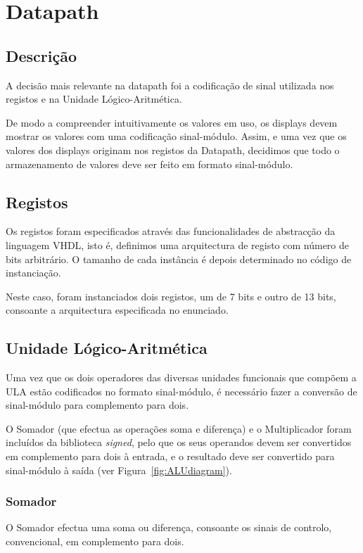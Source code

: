 \documentclass[a4paper]{article}
\begin{document}
\section{Datapath}
\subsection{Descrição}
A decisão mais relevante na datapath foi a codificação de sinal utilizada nos registos e na Unidade Lógico-Aritmética.

De modo a compreender intuitivamente os valores em uso, os displays devem mostrar os valores com uma codificação sinal-módulo. Assim, e uma vez que os valores dos displays originam nos registos da Datapath, decidimos que todo o armazenamento de valores deve ser feito em formato sinal-módulo.


\subsection{Registos}
Os registos foram especificados através das funcionalidades de abstracção da linguagem VHDL, isto é, definimos uma arquitectura de registo com número de bits arbitrário. O tamanho de cada instância é depois determinado no código de instanciação.

Neste caso, foram instanciados dois registos, um de 7 bits e outro de 13 bits, consoante a arquitectura especificada no enunciado.


\subsection{Unidade Lógico-Aritmética}
Uma vez que os dois operadores das diversas unidades funcionais que compõem a ULA estão codificados no formato sinal-módulo, é necessário fazer a conversão de sinal-módulo para complemento para dois.

O Somador (que efectua as operações soma e diferença) e o Multiplicador foram incluídos da biblioteca \emph{signed}, pelo que os seus operandos devem ser convertidos em complemento para dois à entrada, e o resultado deve ser convertido para sinal-módulo à saída (ver Figura~\ref{fig:ALUdiagram}).


\subsubsection{Somador}
O Somador efectua uma soma ou diferença, consoante os sinais de controlo, convencional, em complemento para dois.
\end{document}
